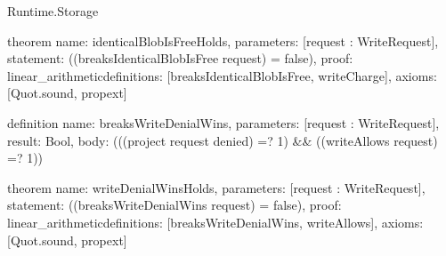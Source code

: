 \begin{lexlean}{Runtime.Storage}
\begin{semanticmodule}
theorem{
  name: identicalBlobIsFreeHolds,
  parameters: [request : WriteRequest],
  statement: ((breaksIdenticalBlobIsFree request) = false),
  proof: linear_arithmetic{definitions: [breaksIdenticalBlobIsFree, writeCharge]},
  axioms: [Quot.sound, propext]
}

definition{
  name: breaksWriteDenialWins,
  parameters: [request : WriteRequest],
  result: Bool,
  body: (((project request denied) =? 1) && ((writeAllows request) =? 1))
}

theorem{
  name: writeDenialWinsHolds,
  parameters: [request : WriteRequest],
  statement: ((breaksWriteDenialWins request) = false),
  proof: linear_arithmetic{definitions: [breaksWriteDenialWins, writeAllows]},
  axioms: [Quot.sound, propext]
}
\end{semanticmodule}
\end{lexlean}
